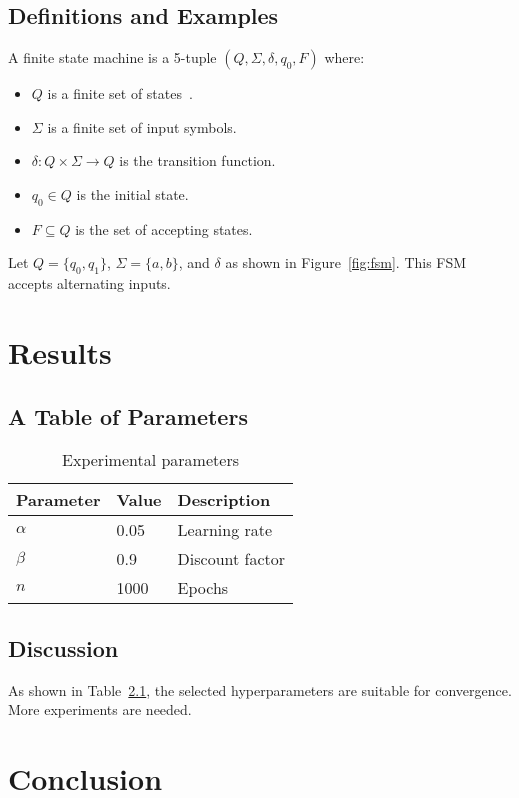 \documentclass{unicamthesis}
\begin{document}
\section{Definitions and Examples}
\begin{definition}
	A finite state machine is a 5-tuple $(Q, \Sigma, \delta, q_0, F)$ where:
	\begin{itemize}
		\item $Q$ is a finite set of states~\cite{permenev2020verx,mavridouL18fsolidm}.
		\item $\Sigma$ is a finite set of input symbols.
		\item $\delta : Q \times \Sigma \to Q$ is the transition function.
		\item $q_0 \in Q$ is the initial state.
		\item $F \subseteq Q$ is the set of accepting states.
	\end{itemize}
\end{definition}

\begin{example}
	Let $Q = \{q_0, q_1\}$, $\Sigma = \{a, b\}$, and $\delta$ as shown in Figure~\ref{fig:fsm}. This FSM accepts alternating inputs.
\end{example}

\chapter{Results}
\section{A Table of Parameters}

\begin{table}[ht]
	\centering
	\begin{tabular}{@{}lll@{}}
		\toprule
		Parameter & Value & Description \\
		\midrule
		$\alpha$ & 0.05 & Learning rate \\
		$\beta$ & 0.9 & Discount factor \\
		$n$     & 1000 & Epochs \\
		\bottomrule
	\end{tabular}
	\caption{Experimental parameters}
	\label{tab:params}
\end{table}

\section{Discussion}
As shown in Table~\ref{tab:params}, the selected hyperparameters are suitable for convergence. More experiments are needed.

\chapter{Conclusion}
\lipsum[4-5]




\end{document}
